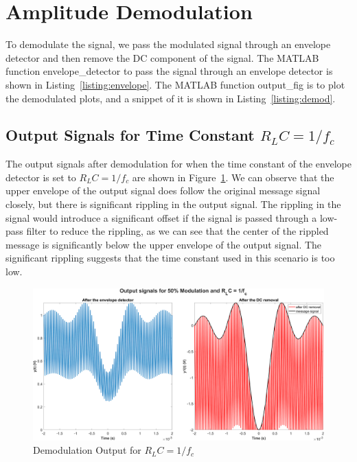 \documentclass[12pt]{article}
\begin{document}
\section*{Amplitude Demodulation}
To demodulate the signal, we pass the modulated signal through an envelope detector and then remove the DC component of the signal. The MATLAB function envelope\_detector to pass the signal through an envelope detector is shown in Listing~\ref{listing:envelope}. The MATLAB function output\_fig is to plot the demodulated plots, and a snippet of it is shown in Listing~\ref{listing:demod}.



\subsection*{Output Signals for Time Constant $R_LC = 1/f_c$}
The output signals after demodulation for when the time constant of the envelope detector is set to $R_LC = 1/f_c$ are shown in Figure~\ref{fig:q2i}. We can observe that the upper envelope of the output signal does follow the original message signal closely, but there is significant rippling in the output signal. The rippling in the signal would introduce a significant offset if the signal is passed through a low-pass filter to reduce the rippling, as we can see that the center of the rippled message is significantly below the upper envelope of the output signal. The significant rippling suggests that the time constant used in this scenario is too low.
\begin{figure}[h!]
    \centering
    \includegraphics[width=\textwidth]{q2i}
    \caption{\label{fig:q2i}Demodulation Output for $R_LC = 1/f_c$}
\end{figure}
\end{document}
